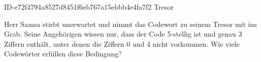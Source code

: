 \begin{exercise}
      {ID-e72f4794a8527d8451f6eb767a15ebbb4e4fa7f2}
      {Tresor}
  \ifproblem\problem\par
    Herr Samsa stirbt unerwartet und nimmt das Codewort zu seinem Tresor mit
    ins Grab. Seine Angehörigen wissen nur, dass der Code 5-stellig ist und genau
    3 Ziffern enthält, unter denen die Ziffern 0 und 4 nicht vorkommen. Wie viele
    Codewörter erfüllen diese Bedingung?
  \fi
\end{exercise}
